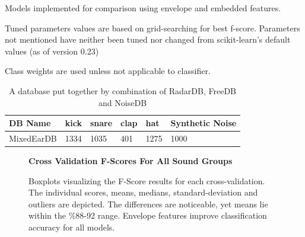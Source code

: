 \documentclass[runningheads,a4paper]{llncs}
\begin{document}
\begin{appendices}
\begin{table}[t]
\begin{threeparttable}
    \caption{Models implemented for comparison using envelope and embedded features. }
    \begin{tablenotes}
    \item[\dag] Tuned parameters values are based on grid-searching for best f-score. Parameters not mentioned have neither been tuned nor changed from scikit-learn's default values (as of version 0.23)
    \item[\ddag] Class weights are used unless not applicable to classifier.
    \end{tablenotes}
    \label{table:mem_model_selection}
    \end{threeparttable}
\end{table}
\begin{table}[htbp]
\centering
\begin{tabular}{|l|l|l|l|l|l|}
\hline
 DB Name & kick & snare & clap & hat & Synthetic Noise\\\hline
 MixedEarDB & 1334 & 1035 & 401 & 1275 & 1000 \\ \hline
\end{tabular}
\caption{A database put together by combination of RadarDB, FreeDB and NoiseDB}
\label{db:memDB}
\end{table}

\begin{figure}[htbp!]
    \begin{center}
    \textbf{Cross Validation F-Scores For All Sound Groups}\par\medskip
    \caption{Boxplots visualizing the F-Score results for each cross-validation. The individual scores, means, medians, standard-deviation and outliers are depicted. The differences are noticeable, yet means lie within the \%88-92 range. Envelope features improve classification accuracy for all models. }
    \label{fig:f1_allg_box}
    \end{center}
\end{figure}


\end{appendices}
\end{document}
